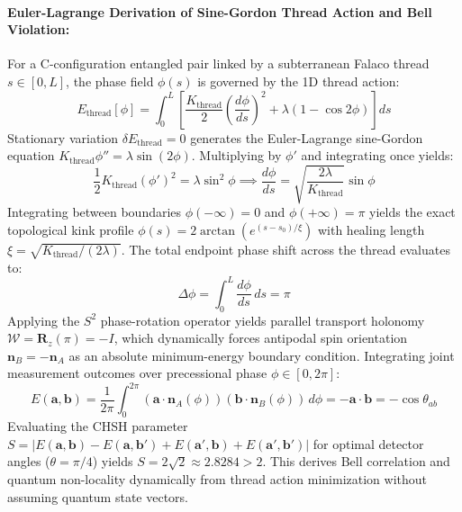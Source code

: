 \documentclass[11pt,a4paper]{article}
\begin{document}
	\paragraph{Euler-Lagrange Derivation of Sine-Gordon Thread Action and Bell Violation:}
	For a C-configuration entangled pair linked by a subterranean Falaco thread $s \in [0, L]$, the phase field $\phi(s)$ is governed by the 1D thread action:
	\begin{equation}
		E_{\text{thread}}[\phi] = \int_0^L \left[ \frac{K_{\text{thread}}}{2} \left(\frac{d\phi}{ds}\right)^2 + \lambda (1 - \cos 2\phi) \right] ds
	\end{equation}
	Stationary variation $\delta E_{\text{thread}} = 0$ generates the Euler-Lagrange sine-Gordon equation $K_{\text{thread}} \phi'' = \lambda \sin(2\phi)$. Multiplying by $\phi'$ and integrating once yields:
	\begin{equation}
		\frac{1}{2} K_{\text{thread}} (\phi')^2 = \lambda \sin^2 \phi \implies \frac{d\phi}{ds} = \sqrt{\frac{2\lambda}{K_{\text{thread}}}} \sin\phi
	\end{equation}
	Integrating between boundaries $\phi(-\infty)=0$ and $\phi(+\infty)=\pi$ yields the exact topological kink profile $\phi(s) = 2\arctan\left(e^{(s-s_0)/\xi}\right)$ with healing length $\xi = \sqrt{K_{\text{thread}}/(2\lambda)}$. The total endpoint phase shift across the thread evaluates to:
	\begin{equation}
		\Delta\phi = \int_0^L \frac{d\phi}{ds} \, ds = \pi
	\end{equation}
	Applying the $S^2$ phase-rotation operator yields parallel transport holonomy $\mathcal{W} = \mathbf{R}_z(\pi) = -I$, which dynamically forces antipodal spin orientation $\mathbf{n}_B = -\mathbf{n}_A$ as an absolute minimum-energy boundary condition. Integrating joint measurement outcomes over precessional phase $\phi \in [0, 2\pi]$:
	\begin{equation}
		E(\mathbf{a}, \mathbf{b}) = \frac{1}{2\pi} \int_0^{2\pi} (\mathbf{a} \cdot \mathbf{n}_A(\phi)) (\mathbf{b} \cdot \mathbf{n}_B(\phi)) \, d\phi = -\mathbf{a} \cdot \mathbf{b} = -\cos\theta_{ab}
	\end{equation}
	Evaluating the CHSH parameter $S = |E(\mathbf{a},\mathbf{b}) - E(\mathbf{a},\mathbf{b}') + E(\mathbf{a}',\mathbf{b}) + E(\mathbf{a}',\mathbf{b}')|$ for optimal detector angles ($\theta = \pi/4$) yields $S = 2\sqrt{2} \approx 2.8284 > 2$. This derives Bell correlation and quantum non-locality dynamically from thread action minimization without assuming quantum state vectors.
	
\end{document}
